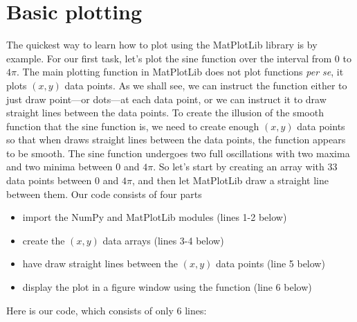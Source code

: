 \documentclass[letterpaper,10pt,english]{sphinxmanual}
\begin{document}
\section{Basic plotting}
\label{chap5/chap5_plot:chap5basicplotting}\label{chap5/chap5_plot:basic-plotting}
The quickest way to learn how to plot using the MatPlotLib library is by example.  For our first task, let's plot the sine function over the interval from 0 to \(4\pi\).  The main plotting function  in MatPlotLib does not plot functions \emph{per se}, it plots \((x,y)\) data points.  As we shall see, we can instruct the function  either to just draw point---or dots---at each data point, or we can instruct it to draw straight lines between the data points.  To create the illusion of the smooth function that the sine function is, we need to create enough \((x,y)\) data points so that when  draws straight lines between the data points, the function appears to be smooth.  The sine function undergoes two full oscillations with two maxima and two minima between 0 and \(4\pi\).  So let's start by creating an array with 33 data points between 0 and \(4\pi\), and then let MatPlotLib draw a straight line between them.  Our code consists of four parts
\begin{itemize}
\item {} 
import the NumPy and MatPlotLib modules (lines 1-2 below)

\item {} 
create the \((x,y)\) data arrays (lines 3-4 below)

\item {} 
have  draw straight lines between the \((x,y)\) data points (line 5 below)

\item {} 
display the plot in a figure window using the  function (line 6 below)

\end{itemize}

Here is our code, which consists of only 6 lines:
\end{document}
